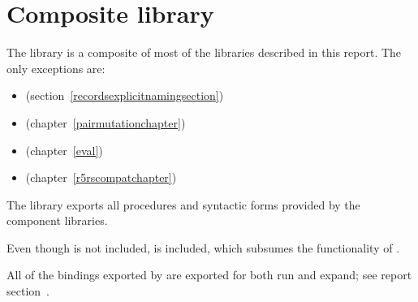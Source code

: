 \chapter{Composite library}
\label{complibchapter}

The  library is a composite of most of the libraries
described in this report.  The only exceptions are:
%
\begin{itemize}
\item {} (section~\ref{recordsexplicitnamingsection})
\item {} (chapter~\ref{pairmutationchapter})
\item {} (chapter~\ref{eval})
\item {} (chapter~\ref{r5rscompatchapter})
\end{itemize}
%
The library exports all procedures and syntactic forms provided by the
component libraries.

\begin{note}
  Even though  is not
  included,  is included, which
  subsumes the functionality of .
\end{note}

All of the bindings exported by  are exported for both {\cf run}
and {\cf expand}; see report section~.


